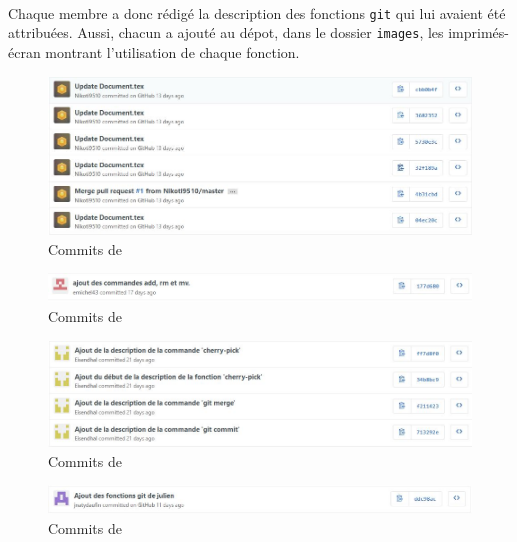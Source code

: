 \documentclass[11pt,canadien]{article}
\begin{document}
\paragraph{}Chaque membre a donc rédigé la description des fonctions \texttt{git} qui lui avaient été attribuées. Aussi, chacun a ajouté au dépot, dans le dossier \texttt{images}, les imprimés-écran montrant l'utilisation de chaque fonction.

\begin{figure}[h]
	\centering
	\includegraphics[width=\textwidth]{images/commit_antoine.JPG}
	\caption{Commits de \antoine}
\end{figure}

\begin{figure}[h]
	\centering
	\includegraphics[width=\textwidth]{images/commit_estelle.JPG}
	\caption{Commits de \estelle}
\end{figure}

\begin{figure}[h]
	\centering
	\includegraphics[width=\textwidth]{images/commit_joffrey.JPG}
	\caption{Commits de \joffrey}
\end{figure}

\begin{figure}[h]
	\centering
	\includegraphics[width=\textwidth]{images/commit_julien.JPG}
	\caption{Commits de \julien}
\end{figure}
\end{document}

